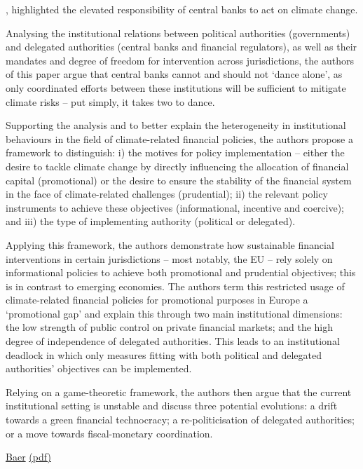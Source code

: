 \documentclass[
]{book}
\begin{document}
, highlighted the elevated responsibility of central banks to act on climate change.

Analysing the institutional relations between political authorities (governments) and delegated authorities (central banks and financial regulators), as well as their mandates and degree of freedom for intervention across jurisdictions, the authors of this paper argue that central banks cannot and should not `dance alone', as only coordinated efforts between these institutions will be sufficient to mitigate climate risks -- put simply, it takes two to dance.

Supporting the analysis and to better explain the heterogeneity in institutional behaviours in the field of climate-related financial policies, the authors propose a framework to distinguish: i) the motives for policy implementation -- either the desire to tackle climate change by directly influencing the allocation of financial capital (promotional) or the desire to ensure the stability of the financial system in the face of climate-related challenges (prudential); ii) the relevant policy instruments to achieve these objectives (informational, incentive and coercive); and iii) the type of implementing authority (political or delegated).

Applying this framework, the authors demonstrate how sustainable financial interventions in certain jurisdictions -- most notably, the EU -- rely solely on informational policies to achieve both promotional and prudential objectives; this is in contrast to emerging economies. The authors term this restricted usage of climate-related financial policies for promotional purposes in Europe a `promotional gap' and explain this through two main institutional dimensions: the low strength of public control on private financial markets; and the high degree of independence of delegated authorities. This leads to an institutional deadlock in which only measures fitting with both political and delegated authorities' objectives can be implemented.

Relying on a game-theoretic framework, the authors then argue that the current institutional setting is unstable and discuss three potential evolutions: a drift towards a green financial technocracy; a re-politicisation of delegated authorities; or a move towards fiscal-monetary coordination.

\href{https://www.lse.ac.uk/granthaminstitute/publication/it-takes-two-to-dance-institutional-dynamics-and-climate-related-financial-policies/}{Baer}
\href{pdf/Baer_2021_Institutional_Climate_Policy_Dynamics.pdf}{(pdf)}
\end{document}
